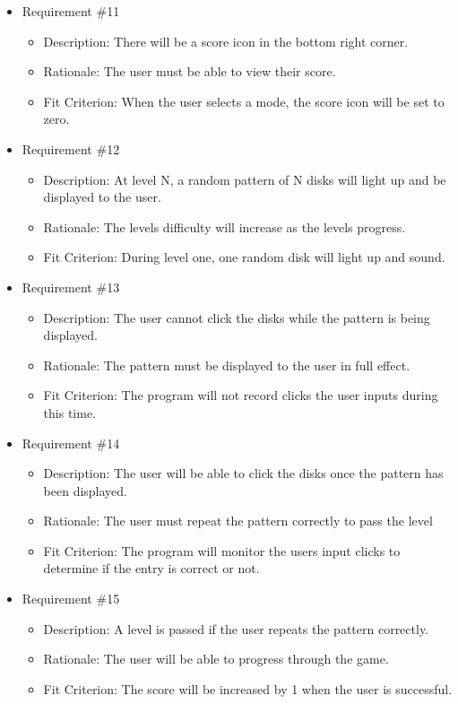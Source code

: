 \documentclass[12pt, titlepage]{article}
\begin{document}
\begin{itemize}
\item Requirement \#11
\begin{itemize}
\item Description: There will be a score icon in the bottom right corner.
\item Rationale: The user must be able to view their score.
\item Fit Criterion: When the user selects a mode, the score icon will be set to zero.
\end{itemize}

\item Requirement \#12
\begin{itemize}
\item Description: At level N, a random pattern of N disks will light up and be displayed to the user.
\item Rationale: The levels difficulty will increase as the levels progress.
\item Fit Criterion: During level one, one random disk will light up and sound.
\end{itemize}

\item Requirement \#13
\begin{itemize}
\item Description: The user cannot click the disks while the pattern is being displayed. 
\item Rationale: The pattern must be displayed to the user in full effect.
\item Fit Criterion: The program will not record clicks the user inputs during this time.
\end{itemize}

\item Requirement \#14
\begin{itemize}
\item Description: The user will be able to click the disks once the pattern has been displayed. 
\item Rationale: The user must repeat the pattern correctly to pass the level
\item Fit Criterion: The program will monitor the users input clicks to determine if the entry is correct or not.
\end{itemize}

\item Requirement \#15
\begin{itemize}
\item Description: A level is passed if the user repeats the pattern correctly.
\item Rationale: The user will be able to progress through the game. 
\item Fit Criterion: The score will be increased by 1 when the user is successful.
\end{itemize}


\end{itemize}
\end{document}
